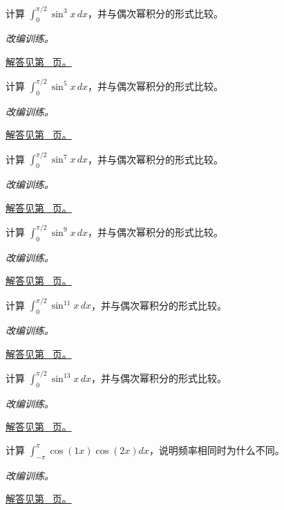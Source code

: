 \documentclass[12pt,fontset=fandol]{ctexart}
\begin{document}
\begin{example}[正弦奇次幂的递推]\label{ex:c16q7}
计算 $\int_0^{\pi/2}\sin^{3}x\,dx$，并与偶次幂积分的形式比较。
\par\textit{改编训练。}\par\hyperref[ans:c16q7]{解答见第~\pageref{ans:c16q7} 页。}
\end{example}
\begin{example}[正弦奇次幂的递推]\label{ex:c16q8}
计算 $\int_0^{\pi/2}\sin^{5}x\,dx$，并与偶次幂积分的形式比较。
\par\textit{改编训练。}\par\hyperref[ans:c16q8]{解答见第~\pageref{ans:c16q8} 页。}
\end{example}
\begin{example}[正弦奇次幂的递推]\label{ex:c16q9}
计算 $\int_0^{\pi/2}\sin^{7}x\,dx$，并与偶次幂积分的形式比较。
\par\textit{改编训练。}\par\hyperref[ans:c16q9]{解答见第~\pageref{ans:c16q9} 页。}
\end{example}
\begin{example}[正弦奇次幂的递推]\label{ex:c16q10}
计算 $\int_0^{\pi/2}\sin^{9}x\,dx$，并与偶次幂积分的形式比较。
\par\textit{改编训练。}\par\hyperref[ans:c16q10]{解答见第~\pageref{ans:c16q10} 页。}
\end{example}
\begin{example}[正弦奇次幂的递推]\label{ex:c16q11}
计算 $\int_0^{\pi/2}\sin^{11}x\,dx$，并与偶次幂积分的形式比较。
\par\textit{改编训练。}\par\hyperref[ans:c16q11]{解答见第~\pageref{ans:c16q11} 页。}
\end{example}
\begin{example}[正弦奇次幂的递推]\label{ex:c16q12}
计算 $\int_0^{\pi/2}\sin^{13}x\,dx$，并与偶次幂积分的形式比较。
\par\textit{改编训练。}\par\hyperref[ans:c16q12]{解答见第~\pageref{ans:c16q12} 页。}
\end{example}
\begin{example}[余弦函数的正交积分]\label{ex:c16q13}
计算 $\int_{-\pi}^\pi\cos(1x)\cos(2x)dx$，说明频率相同时为什么不同。
\par\textit{改编训练。}\par\hyperref[ans:c16q13]{解答见第~\pageref{ans:c16q13} 页。}
\end{example}
\end{document}
